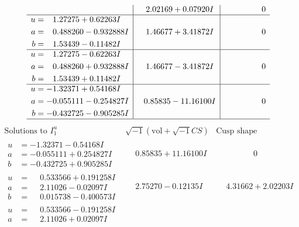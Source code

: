 \documentclass[1p]{elsarticle_modified}
\theoremstyle{definition}
\newcommand{\I}{\sqrt{-1}}
\begin{document}
$$\begin{array}{c|c|c}
 & \phantom{-}2.02169 + 0.07920 I & \phantom{-0.000000 } 0 \\ \hline\begin{aligned}
u &= \phantom{-}1.27275 + 0.62263 I \\
a &= \phantom{-}0.488260 - 0.932888 I \\
b &= \phantom{-}1.53439 - 0.11482 I\end{aligned}
 & \phantom{-}1.46677 + 3.41872 I & \phantom{-0.000000 } 0 \\ \hline\begin{aligned}
u &= \phantom{-}1.27275 - 0.62263 I \\
a &= \phantom{-}0.488260 + 0.932888 I \\
b &= \phantom{-}1.53439 + 0.11482 I\end{aligned}
 & \phantom{-}1.46677 - 3.41872 I & \phantom{-0.000000 } 0 \\ \hline\begin{aligned}
u &= -1.32371 + 0.54168 I \\
a &= -0.055111 - 0.254827 I \\
b &= -0.432725 - 0.905285 I\end{aligned}
 & \phantom{-}0.85835 - 11.16100 I & \phantom{-0.000000 } 0\\
 \hline 
 \end{array}$$\newpage$$\begin{array}{c|c|c}  
\text{Solutions to }I^u_{1}& \I (\text{vol} + \sqrt{-1}CS) & \text{Cusp shape}\\
 \hline 
\begin{aligned}
u &= -1.32371 - 0.54168 I \\
a &= -0.055111 + 0.254827 I \\
b &= -0.432725 + 0.905285 I\end{aligned}
 & \phantom{-}0.85835 + 11.16100 I & \phantom{-0.000000 } 0 \\ \hline\begin{aligned}
u &= \phantom{-}0.533566 + 0.191258 I \\
a &= \phantom{-}2.11026 - 0.02097 I \\
b &= \phantom{-}0.015738 - 0.400573 I\end{aligned}
 & \phantom{-}2.75270 - 0.12135 I & \phantom{-}4.31662 + 2.02203 I \\ \hline\begin{aligned}
u &= \phantom{-}0.533566 - 0.191258 I \\
a &= \phantom{-}2.11026 + 0.02097 I \\

\end{aligned}
\end{array}$$
\end{document}
